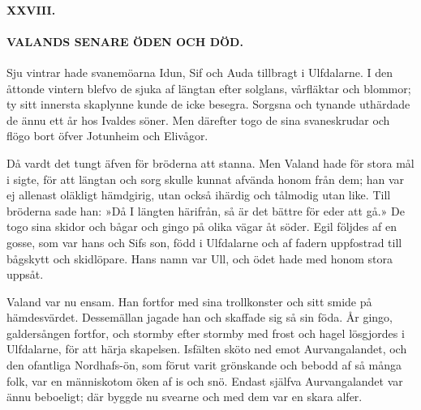 \paragraph{XXVIII.}

\paragraph{VALANDS SENARE ÖDEN OCH DÖD.}

Sju vintrar hade svanemöarna Idun, Sif och Auda tillbragt i Ulfdalarne.
I den åttonde vintern blefvo de sjuka af längtan efter solglans,
vårfläktar och blommor; ty sitt innersta skaplynne kunde de icke
besegra. Sorgsna och tynande uthärdade de ännu ett år hos Ivaldes söner.
Men därefter togo de sina svaneskrudar och flögo bort öfver Jotunheim
och Elivågor.

Då vardt det tungt äfven för bröderna att stanna. Men Valand hade för
stora mål i sigte, för att längtan och sorg skulle kunnat afvända honom
från dem; han var ej allenast
\protect\hypertarget{lb1625905.xhtmlux5cux23start98}{}{}\protect\hypertarget{lb1625905.xhtmlux5cux23start98-a}{}{}\protect\hypertarget{lb1625905.xhtmlux5cux23start98-b}{}{}\protect\hypertarget{lb1625905.xhtmlux5cux23start98-c}{}{}\protect\hypertarget{lb1625905.xhtmlux5cux23start98-d}{}{}
oläkligt hämdgirig, utan också ihärdig och tålmodig utan like. Till
bröderna sade han: »Då I längten härifrån, så är det bättre för eder att
gå.» De togo sina skidor och bågar och gingo på olika vägar åt söder.
Egil följdes af en gosse, som var hans och Sifs son, född i Ulfdalarne
och af fadern uppfostrad till bågskytt och skidlöpare. Hans namn var
Ull, och ödet hade med honom stora uppsåt.

Valand var nu ensam. Han fortfor med sina trollkonster och sitt smide på
hämdesvärdet. Dessemällan jagade han och skaffade sig så sin föda. År
gingo, galdersången fortfor, och stormby efter stormby med frost och
hagel lösgjordes i Ulfdalarne, för att härja skapelsen. Isfälten sköto
ned emot Aurvangalandet, och den ofantliga Nordhafs-ön, som förut varit
grönskande och bebodd af så många folk, var en människotom öken af is
och snö. Endast själfva Aurvangalandet var ännu beboeligt; där byggde nu
svearne och med dem var en skara alfer.

